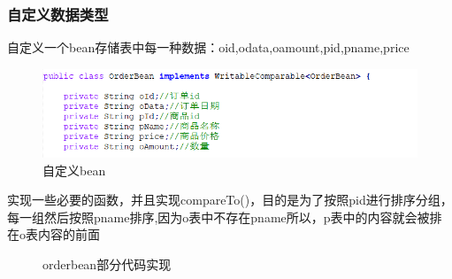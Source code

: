 \documentclass[a4paper,UTF8]{article}
\numberwithin{equation}{section}
\begin{document}
\subsubsection{自定义数据类型}
自定义一个bean存储表中每一种数据：oid,odata,oamount,pid,pname,price
\begin{figure}[H]
    \centering

    \includegraphics[width = 15cm]{bean1.png}

    \caption{自定义bean}
\end{figure}
实现一些必要的函数，并且实现compareTo()，目的是为了按照pid进行排序分组，每一组然后按照pname排序,因为o表中不存在pname所以，p表中的内容就会被排在o表内容的前面
\begin{figure}[H]
    \centering
    \vfill
    \vfill

    \caption{orderbean部分代码实现}
\end{figure}
\end{document}
